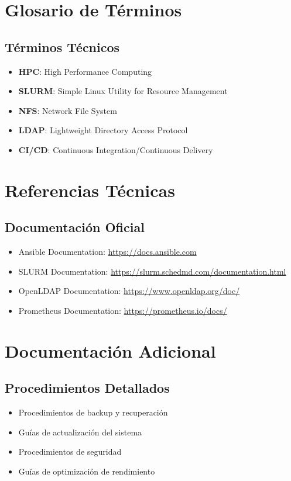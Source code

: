 \begin{appendix}
\chapter{Glosario de Términos}
\section{Términos Técnicos}
\begin{itemize}
    \item \textbf{HPC}: High Performance Computing
    \item \textbf{SLURM}: Simple Linux Utility for Resource Management
    \item \textbf{NFS}: Network File System
    \item \textbf{LDAP}: Lightweight Directory Access Protocol
    \item \textbf{CI/CD}: Continuous Integration/Continuous Delivery
\end{itemize}

\chapter{Referencias Técnicas}
\section{Documentación Oficial}
\begin{itemize}
    \item Ansible Documentation: \url{https://docs.ansible.com}
    \item SLURM Documentation: \url{https://slurm.schedmd.com/documentation.html}
    \item OpenLDAP Documentation: \url{https://www.openldap.org/doc/}
    \item Prometheus Documentation: \url{https://prometheus.io/docs/}
\end{itemize}

\chapter{Documentación Adicional}
\section{Procedimientos Detallados}
\begin{itemize}
    \item Procedimientos de backup y recuperación
    \item Guías de actualización del sistema
    \item Procedimientos de seguridad
    \item Guías de optimización de rendimiento
\end{itemize}
\end{appendix}

 